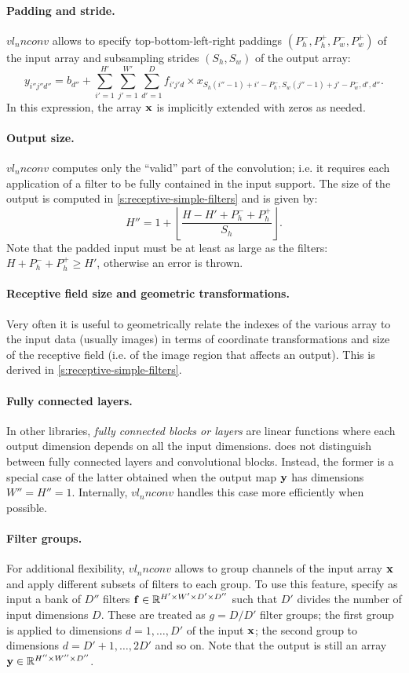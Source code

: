 \paragraph{Padding and stride.} $vl_nnconv$ allows to specify  top-bottom-left-right paddings $(P_h^-,P_h^+,P_w^-,P_w^+)$ of the input array and subsampling strides $(S_h,S_w)$ of the output array:
\[
y_{i''j''d''}
=
b_{d''}
+
\sum_{i'=1}^{H'}
\sum_{j'=1}^{W'}
\sum_{d'=1}^D
f_{i'j'd} \times x_{S_h (i''-1)+i'-P_h^-, S_w(j''-1)+j' - P_w^-,d',d''}.
\]
In this expression, the array $\mathbf{x}$ is implicitly extended with zeros as needed.

\paragraph{Output size.} $vl_nnconv$ computes only the ``valid'' part of the convolution; i.e. it requires each application of a filter to be fully contained in the input support.  The size of the output is computed in \cref{s:receptive-simple-filters} and is given by:
\[
H'' = 1 + \left\lfloor \frac{H - H' + P_h^- + P_h^+}{S_h} \right\rfloor.
\]
Note that the padded input must be at least as large as the filters: $H +P_h^- + P_h^+ \geq H'$, otherwise an error is thrown.

\paragraph{Receptive field size and geometric transformations.} Very often it is useful to geometrically relate the indexes of the various array to the input data (usually images) in terms of coordinate transformations and size of the receptive field (i.e. of the image region that affects an output). This is derived in \cref{s:receptive-simple-filters}.

\paragraph{Fully connected layers.} In other libraries, \emph{fully connected blocks or layers} are linear functions where each output dimension depends on all the input dimensions. \matconvnet does not distinguish between fully connected layers and convolutional blocks. Instead, the former is a special case of the latter obtained when the output map $\mathbf{y}$ has dimensions $W''=H''=1$. Internally, $vl_nnconv$ handles this case more efficiently when possible.

\paragraph{Filter groups.} For additional flexibility, $vl_nnconv$ allows to group channels of the input array $\mathbf{x}$ and apply different subsets of filters to each group. To use this feature, specify as input a bank  of $D''$ filters $\mathbf{f}\in\mathbb{R}^{H'\times W'\times D'\times D''}$ such that $D'$ divides the number of input dimensions $D$. These are treated as $g=D/D'$ filter groups; the first group is applied to dimensions $d=1,\dots,D'$ of the input $\mathbf{x}$; the second group to dimensions $d=D'+1,\dots,2D'$ and so on. Note that the output is still an array $\mathbf{y}\in\mathbb{R}^{H''\times W''\times D''}$.


